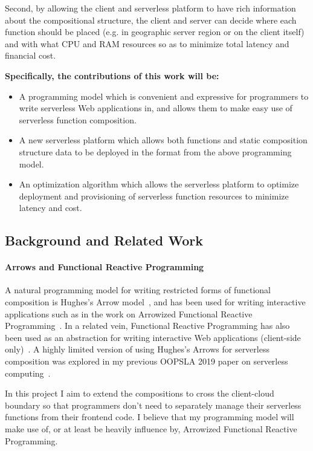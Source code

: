 \documentclass[12pt]{article}
\begin{document}
Second, by allowing the client and serverless platform to have rich
information about the compositional structure, the client and
server can decide where each function should be placed 
(e.g. in geographic server region or on the client itself)
and with what CPU and RAM resources
so as to minimize total latency and financial cost.

\textbf{Specifically, the contributions of this work will be:}
\begin{itemize}
  \item A programming model which is convenient and expressive
    for programmers to write serverless Web applications in,
    and allows them to make easy use of serverless function
    composition.
  \item A new serverless platform which allows both functions and 
    static composition structure data to be deployed in the format
    from the above programming model.
  \item An optimization algorithm which allows the serverless
    platform to optimize deployment and provisioning of
    serverless function resources to minimize latency 
    and cost.
\end{itemize}

\subsection{Background and Related Work}

\paragraph{Arrows and Functional Reactive Programming}
A natural programming model for writing restricted forms of
functional composition is Hughes's 
Arrow model~\cite{hughes:arrows}, and has been used
for writing interactive applications such as in 
the work on 
Arrowized Functional Reactive Programming~\cite{nilsson:afrp}.
In a related vein, Functional Reactive Programming has also
been used as an abstraction for writing interactive Web
applications (client-side only)~\cite{flapjax}.
A highly limited version of using Hughes's Arrows for
serverless composition was explored in my
previous OOPSLA 2019 paper on 
serverless computing~\cite{jangda:lambda-lambda}.

In this project I aim to extend the compositions to cross the
client-cloud boundary so that programmers don't need to separately
manage their serverless functions from their frontend code.
I believe that my programming model will make use of,
or at least be heavily influence by, Arrowized Functional
Reactive Programming.
\end{document}
